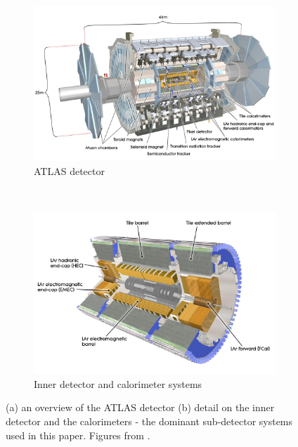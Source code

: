 \begin{figure}[t]
  \centering
  \begin{subfigure}[b]{0.8\textwidth}
    \includegraphics[width=\textwidth]{Chapter2/ATLAS.png}
    \caption{ATLAS detector}
    \label{fig:ATLASfull}
  \end{subfigure}
  ~
  \begin{subfigure}[b]{0.8\textwidth}
    \includegraphics[width=\textwidth]{Chapter2/ATLASinner.jpeg}
    \caption{Inner detector and calorimeter systems}
    \label{fig:ATLASinner}
  \end{subfigure}
  \caption{(a) an overview of the ATLAS detector 
           (b) detail on the inner detector and the calorimeters - the dominant
           sub-detector systems used in this paper. Figures from
           \cite{CERNbook}.}
  \label{fig:ATLAS}
\end{figure}

